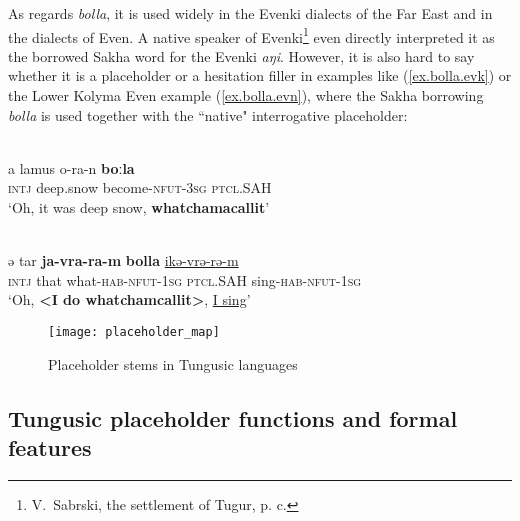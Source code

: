 \documentclass[output=paper,colorlinks,citecolor=brown
\ChapterDOI{10.5281/zenodo.15697577}
]{langscibook}
\begin{document}
As regards \textit{bolla}, it is used widely in the Evenki dialects of the Far East and in the dialects of Even. A native speaker of Evenki\footnote{V.~Sabrski, the settlement of Tugur, p. c.} even directly interpreted it as the borrowed Sakha word for the Evenki \textit{aŋi}. However, it is also hard to say whether it is a placeholder or a hesitation filler in examples like (\ref{ex.bolla.evk}) or the Lower Kolyma Even example (\ref{ex.bolla.evn}), where the Sakha borrowing \textit{bolla} is used together with the ``native" interrogative placeholder:

 \ea \label{ex.bolla.evk}
 \\
 \gll a lamus o-ra-n \textbf{boːla}\\
\textsc{intj} deep.snow become-\textsc{nfut}-\textsc{3sg} \textsc{ptcl}.SAH\\
\glt `Oh, it was deep snow, \textbf{whatchamacallit}' \\
 \z
{}


 \ea \label{ex.bolla.evn}
 \\
 \gll ə tar \textbf{ja-vra-ra-m} \textbf{bolla} \uline{ikə-vrə-rə-m}\\
\textsc{intj} that what-\textsc{hab}-\textsc{nfut}-\textsc{1sg} \textsc{ptcl}.SAH sing-\textsc{hab}-\textsc{nfut}-\textsc{1sg}\\
\glt `Oh, \textbf{<I do whatchamcallit>}, \uline{I sing}' \\
 \z
{}

\begin{figure}
 \centering
\texttt{[image: placeholder\_map]}
 \caption{Placeholder stems in Tungusic languages}
 \label{fig:stems}
\end{figure}

\subsection{Tungusic placeholder functions and formal features}
\end{document}
